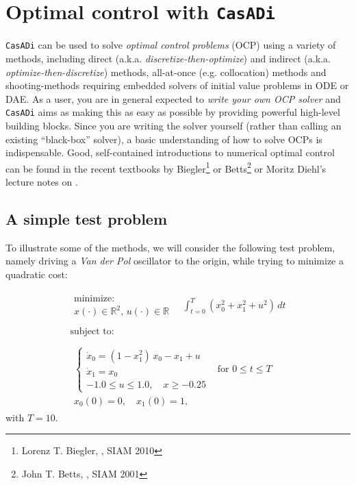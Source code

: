 \documentclass[a4paper,12pt]{book}
\newcommand{\CasADi}{\texttt{CasADi}\xspace}
\begin{document}
\chapter{Optimal control with \CasADi}
\CasADi can be used to solve \emph{optimal control problems} (OCP) using a variety of methods, including direct (a.k.a. \emph{discretize-then-optimize}) and indirect (a.k.a. \emph{optimize-then-discretize}) methods, all-at-once (e.g. collocation) methods and shooting-methods requiring embedded solvers of initial value problems in ODE or DAE. As a user, you are in general expected to \emph{write your own OCP solver} and \CasADi aims as making this as easy as possible by providing powerful high-level building blocks. Since you are writing the solver yourself (rather than calling an existing ``black-box'' solver), a basic understanding of how to solve OCPs is indispensable. Good, self-contained introductions to numerical optimal control can be found in the recent textbooks by Biegler\footnote{Lorenz T. Biegler, \emph{}, SIAM 2010} or Betts\footnote{John T. Betts, \emph{}, SIAM 2001} or Moritz Diehl's lecture notes on .

\section{A simple test problem}
To illustrate some of the methods, we will consider the following test problem,
namely driving a \emph{Van der Pol} oscillator to the origin, while trying to
minimize a quadratic cost:

\begin{equation}
\begin{array}{lc}
\begin{array}{l}
\text{minimize:} \\
x(\cdot) \in \mathbb{R}^2, \, u(\cdot) \in \mathbb{R}
\end{array}
\quad \displaystyle \int_{t=0}^{T}{(x_0^2 + x_1^2 + u^2) \, dt}
\\
\\
\text{subject to:} \\
\\
\begin{array}{ll}
\left\{
\begin{array}{l}
\dot{x}_0 = (1-x_1^2) \, x_0 - x_1 + u \\
\dot{x}_1 = x_0 \\
-1.0 \le u \le 1.0, \quad x \ge -0.25
\end{array} \right. & \text{for $0 \le t \le T$} \\
x_0(0)=0, \quad x_1(0)=1,
\end{array}
\end{array}
\label{eq:vdp}
\end{equation}
with $T=10$.
\end{document}

